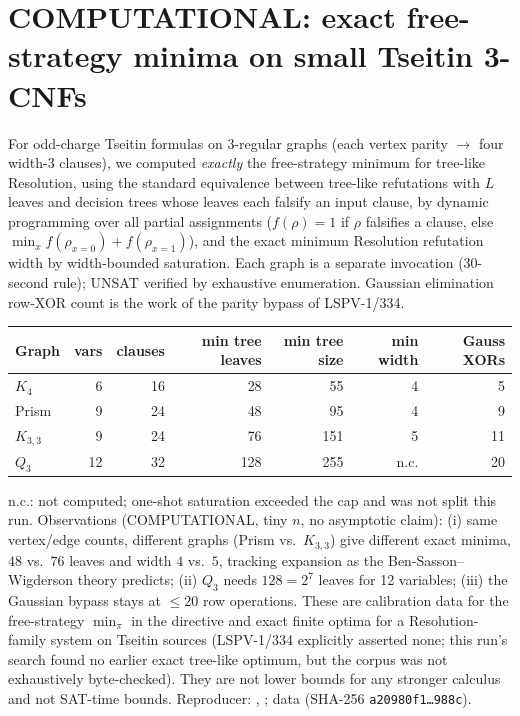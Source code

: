 \documentclass[11pt]{article}
\begin{document}
\section{COMPUTATIONAL: exact free-strategy minima on small Tseitin 3-CNFs}
For odd-charge Tseitin formulas on 3-regular graphs (each vertex parity
$\to$ four width-3 clauses), we computed \emph{exactly} the free-strategy
minimum for tree-like Resolution, using the standard equivalence between
tree-like refutations with $L$ leaves and decision trees whose leaves each
falsify an input clause, by dynamic programming over all partial assignments
($f(\rho)=1$ if $\rho$ falsifies a clause, else $\min_x f(\rho_{x=0})+f(\rho_{x=1})$),
and the exact minimum Resolution refutation width by width-bounded saturation.
Each graph is a separate invocation (30-second rule); UNSAT verified by
exhaustive enumeration. Gaussian elimination row-XOR count is the work of
the parity bypass of LSPV-1/334.

\begin{center}
\begin{tabular}{lrrrrrr}
\toprule
Graph & vars & clauses & min tree leaves & min tree size & min width & Gauss XORs\\
\midrule
$K_4$ & 6 & 16 & 28 & 55 & 4 & 5\\
Prism & 9 & 24 & 48 & 95 & 4 & 9\\
$K_{3,3}$ & 9 & 24 & 76 & 151 & 5 & 11\\
$Q_3$ & 12 & 32 & 128 & 255 & n.c. & 20\\
\bottomrule
\end{tabular}
\end{center}
\noindent n.c.: not computed; one-shot saturation exceeded the cap and was not
split this run. Observations (COMPUTATIONAL, tiny $n$, no asymptotic claim):
(i) same vertex/edge counts, different graphs (Prism vs.\ $K_{3,3}$) give
different exact minima, $48$ vs.\ $76$ leaves and width $4$ vs.\ $5$, tracking
expansion as the Ben-Sasson--Wigderson theory predicts; (ii) $Q_3$ needs
$128=2^7$ leaves for 12 variables; (iii) the Gaussian bypass stays at
$\le 20$ row operations. These are calibration data for the free-strategy
$\min_\pi$ in the directive and exact finite optima for a Resolution-family system on Tseitin sources
(LSPV-1/334 explicitly asserted none; this run's search found no earlier
exact tree-like optimum, but the corpus was not exhaustively byte-checked). They are not lower bounds for any stronger
calculus and not SAT-time bounds.
Reproducer: ,
;
data 
(SHA-256 \texttt{a20980f1\ldots988c}).
\end{document}
